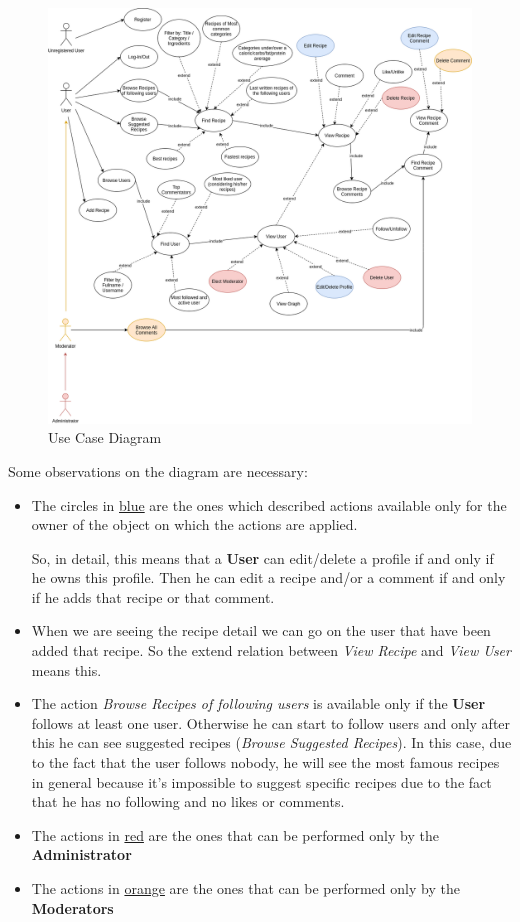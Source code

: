 \documentclass[a4paper]{report}
\begin{document}
\begin{figure}[htpb]
	\centering
	\includegraphics[scale=0.42]{img/UseCaseDiagram.png}
	\caption{Use Case Diagram}
\end{figure}
Some observations on the diagram are necessary:
\begin{itemize}
	\item The circles in \underline{blue} are the ones which described actions available only for the owner of the object on which the actions are applied.
	
	\noindent So, in detail, this means that a \textbf{User} can edit/delete a profile if and only if he owns this profile. Then he can edit a recipe and/or a comment if and only if he adds that recipe or that comment.
	
	\item When we are seeing the recipe detail we can go on the user that have been added that recipe. So the extend relation between \emph{View Recipe} and \emph{View User} means this.
	
	\item The action \emph{Browse Recipes of following users} is available only if the \textbf{User} follows at least one user. Otherwise he can start to follow users and only after this he can see suggested recipes (\emph{Browse Suggested Recipes}). In this case, due to the fact that the user follows nobody, he will see the most famous recipes in general because it's impossible to suggest specific recipes due to the fact that he has no following and no likes or comments. 
	
	\item The actions in \underline{red} are the ones that can be performed only by the \textbf{Administrator}
	
	\item The actions in \underline{orange} are the ones that can be performed only by the \textbf{Moderators}
\end{itemize}
\end{document}
